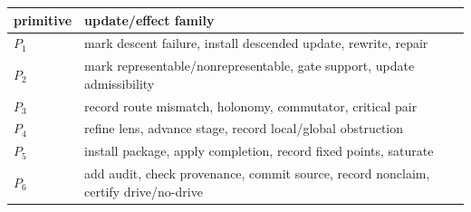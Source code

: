 \documentclass[11pt]{article}
\theoremstyle{definition}
\begin{document}
\begin{longtable}[]{@{}ll@{}}
\toprule
\begin{minipage}[b]{0.08\columnwidth}\raggedright
primitive\strut
\end{minipage} & \begin{minipage}[b]{0.86\columnwidth}\raggedright
update/effect family\strut
\end{minipage}\tabularnewline
\midrule
\endhead
\begin{minipage}[t]{0.08\columnwidth}\raggedright
\(P_{1}\)\strut
\end{minipage} & \begin{minipage}[t]{0.86\columnwidth}\raggedright
mark descent failure, install descended update, rewrite, repair\strut
\end{minipage}\tabularnewline
\begin{minipage}[t]{0.08\columnwidth}\raggedright
\(P_{2}\)\strut
\end{minipage} & \begin{minipage}[t]{0.86\columnwidth}\raggedright
mark representable/nonrepresentable, gate support, update admissibility\strut
\end{minipage}\tabularnewline
\begin{minipage}[t]{0.08\columnwidth}\raggedright
\(P_{3}\)\strut
\end{minipage} & \begin{minipage}[t]{0.86\columnwidth}\raggedright
record route mismatch, holonomy, commutator, critical pair\strut
\end{minipage}\tabularnewline
\begin{minipage}[t]{0.08\columnwidth}\raggedright
\(P_{4}\)\strut
\end{minipage} & \begin{minipage}[t]{0.86\columnwidth}\raggedright
refine lens, advance stage, record local/global obstruction\strut
\end{minipage}\tabularnewline
\begin{minipage}[t]{0.08\columnwidth}\raggedright
\(P_{5}\)\strut
\end{minipage} & \begin{minipage}[t]{0.86\columnwidth}\raggedright
install package, apply completion, record fixed points, saturate\strut
\end{minipage}\tabularnewline
\begin{minipage}[t]{0.08\columnwidth}\raggedright
\(P_{6}\)\strut
\end{minipage} & \begin{minipage}[t]{0.86\columnwidth}\raggedright
add audit, check provenance, commit source, record nonclaim, certify drive/no-drive\strut
\end{minipage}\tabularnewline
\bottomrule
\end{longtable}
\end{document}
